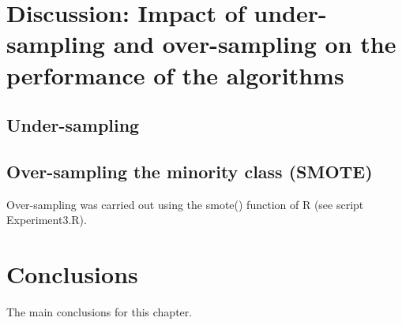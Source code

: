 \section{Discussion: Impact of under-sampling and over-sampling on the performance of the algorithms}
\subsection{Under-sampling}


\subsection{Over-sampling the minority class (SMOTE)}
Over-sampling was carried out using the smote() function of R (see script Experiment3.R).


\section{Conclusions}

The main conclusions for this chapter.


